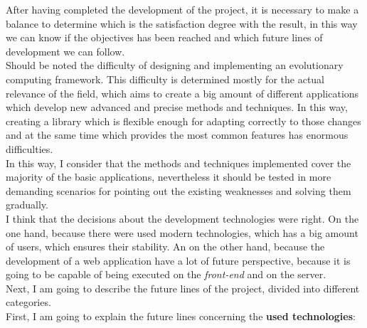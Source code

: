 

After having completed the development of the project, it is necessary to make a balance to determine which is the satisfaction degree with the result, in this way we can know if the objectives has been reached and which future lines of development we can follow. \\

Should be noted the difficulty of designing and implementing an evolutionary computing framework. This difficulty is determined mostly for the actual relevance of the field, which aims to create a big amount of different applications which develop new advanced and precise methods and techniques. In this way, creating a library which is flexible enough for adapting correctly to those changes and at the same time which provides the most common features has enormous difficulties. \\

In this way, I consider that the methods and techniques implemented cover the majority of the basic applications, nevertheless it should be tested in more demanding scenarios for pointing out the existing weaknesses and solving them gradually. \\

I think that the decisions about the development technologies were right. On the one hand, because there were used modern technologies, which has a big amount of users, which ensures their stability. An on the other hand, because the development of a web application have a lot of future perspective, because it is going to be capable of being executed on the \textit{front-end} and on the server. \\

Next, I am going to describe the future lines of the project, divided into different categories. \\

First, I am going to explain the future lines concerning the \textbf{used technologies}:

